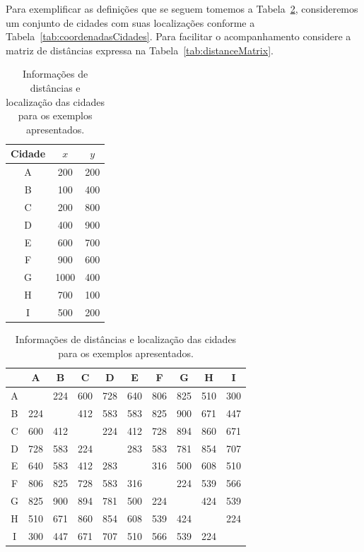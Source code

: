 Para exemplificar as definições que se seguem tomemos a Tabela~\ref{tab:coordenadasComMatrizDistancias}, consideremos um conjunto de cidades com suas localizações conforme a Tabela~\ref{tab:coordenadasCidades}.
Para facilitar o acompanhamento considere a matriz de distâncias expressa na Tabela~\ref{tab:distanceMatrix}.

\begin{table}[ht]
    \centering
    \begin{subtable}{.3\textwidth}
    \centering
    \begin{tabular}{c|cc}
    	\hline
    	Cidade & $x$ & $y$ \\
    	\hline
    	A &	200 &	200 \\
    	B &	100 &	400 \\
    	C &	200 &	800 \\
    	D &	400 &	900 \\
    	E &	600 &	700 \\
    	F &	900 &	600 \\
    	G &	1000 &	400 \\
    	H &	700 &	100 \\
    	I &	500 &	200 \\
    	\hline
    \end{tabular}
    \caption{Coordenadas das cidades.}
    \label{tab:coordenadasCidades}
    \end{subtable}%
    \begin{subtable}{.675\textwidth}
    \centering
    \begin{tabular}{c|ccccccccc}
    	\hline
    	   &   A&   B&   C&   D&   E&   F&   G&   H&   I\\
    	\hline
    	 A &    & 224& 600& 728& 640& 806& 825& 510& 300\\
    	 B & 224&    & 412& 583& 583& 825& 900& 671& 447\\
    	 C & 600& 412&    & 224& 412& 728& 894& 860& 671\\
    	 D & 728& 583& 224&    & 283& 583& 781& 854& 707\\
    	 E & 640& 583& 412& 283&    & 316& 500& 608& 510\\
    	 F & 806& 825& 728& 583& 316&    & 224& 539& 566\\
    	 G & 825& 900& 894& 781& 500& 224&    & 424& 539\\
    	 H & 510& 671& 860& 854& 608& 539& 424&    & 224\\
    	 I & 300& 447& 671& 707& 510& 566& 539& 224& \\
    	 \hline
    \end{tabular}
    \caption{Matriz de distâncias euclidianas com valores inteiros arredondados.}
	\label{tab:distanceMatrix}
    \end{subtable}
\caption{Informações de distâncias e localização das cidades para os exemplos apresentados.}
\label{tab:coordenadasComMatrizDistancias}
\end{table}

